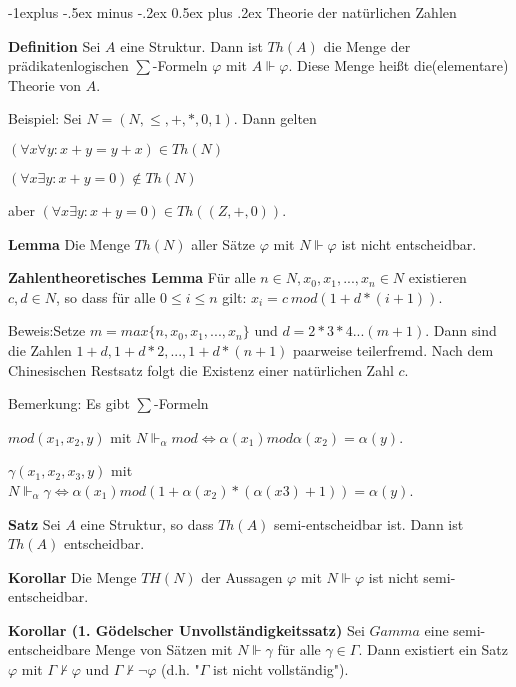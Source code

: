 \documentclass[a4paper]{article}
\makeatletter
\renewcommand{\note}[2]{\begin{noteBox} \textbf{#1} #2 \end{noteBox}}
\renewcommand{\subsection}{\@startsection{subsection}{2}{0mm}%
                {-1explus -.5ex minus -.2ex}%
                {0.5ex plus .2ex}%
                {\normalfont\normalsize\bfseries}}
\makeatother
\begin{document}
\begin{multicols}{3}
  \subsection{Theorie der natürlichen Zahlen}
  \note{Definition}{Sei $A$ eine Struktur. Dann ist $Th(A)$ die Menge der prädikatenlogischen $\sum$-Formeln $\varphi$ mit $A\Vdash\varphi$. Diese Menge heißt die(elementare) Theorie von $A$.}

  Beispiel: Sei $N= (N,\leq,+,*, 0 , 1 )$. Dann gelten
  \begin{itemize*}
    \item $(\forall x\forall y:x+y=y+x)\in Th(N)$
    \item $(\forall x\exists y:x+y= 0 )\not\in Th(N)$
    \item aber $(\forall x\exists y:x+y= 0 )\in Th((Z,+, 0 ))$.
  \end{itemize*}

  \note{Lemma}{Die Menge $Th(N)$ aller Sätze $\varphi$ mit $N\Vdash\varphi$ ist nicht entscheidbar.}

  \note{Zahlentheoretisches Lemma}{Für alle $n\in N,x_0,x_1,...,x_n\in N$ existieren $c,d\in N$, so dass für alle $0\leq i\leq n$ gilt: $x_i=c\ mod ( 1 +d*(i+ 1 ))$.}

  Beweis:Setze $m= max\{n,x_0,x_1 ,...,x_n\}$ und $d=2*3*4...(m+1)$. Dann sind die Zahlen $1+d, 1+d*2,..., 1 +d*(n+1)$ paarweise teilerfremd. Nach dem Chinesischen Restsatz folgt die Existenz
  einer natürlichen Zahl $c$.

  Bemerkung: Es gibt $\sum$-Formeln
  \begin{itemize*}
    \item $mod(x_1,x_2 ,y)$ mit $N\Vdash_{\alpha} mod \Leftrightarrow \alpha (x_1) mod\alpha (x_2) =\alpha (y)$.
    \item $\gamma(x_1 ,x_2 ,x_3 ,y)$ mit $N\Vdash_{\alpha} \gamma\Leftrightarrow \alpha(x_1) mod(1+\alpha(x_2)*(\alpha (x3)+1)) =\alpha (y)$.
  \end{itemize*}

  \note{Satz}{Sei $A$ eine Struktur, so dass $Th(A)$ semi-entscheidbar ist. Dann ist $Th(A)$ entscheidbar.}

  \note{Korollar}{Die Menge $TH(N)$ der Aussagen $\varphi$ mit $N\Vdash\varphi$ ist nicht semi-entscheidbar.}

  \note{Korollar (1. Gödelscher Unvollständigkeitssatz)}{Sei $Gamma$ eine semi-entscheidbare Menge von Sätzen mit $N\Vdash\gamma$ für alle $\gamma\in\Gamma$. Dann existiert ein Satz $\varphi$ mit $\Gamma\not\vdash\varphi$ und $\Gamma\not\vdash\lnot\varphi$ (d.h. "$\Gamma$ ist nicht vollständig").}


\end{multicols}
\end{document}

